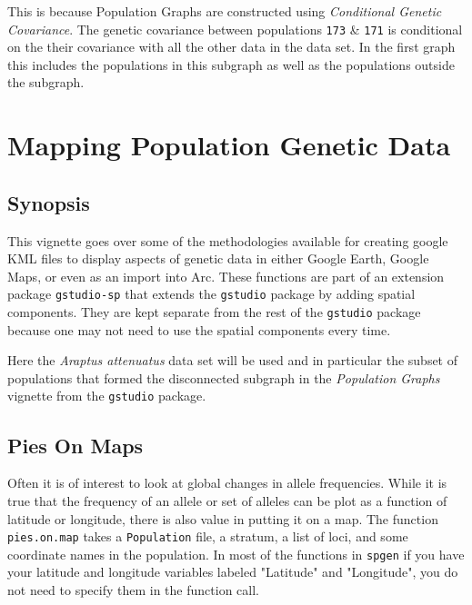 \documentclass[letterpaper,twoside,openany]{book}
\begin{document}
This is because Population Graphs are constructed using \emph{Conditional Genetic Covariance}.  The genetic covariance between populations \texttt{173} \& \texttt{171} is conditional on the their covariance with all the other data in the data set.  In the first graph this includes the populations in this subgraph as well as the populations outside the subgraph.  
%
%


\chapter{Mapping Population Genetic Data}

\section{Synopsis}

This vignette goes over some of the methodologies available for creating google KML files to display aspects of genetic data in either Google Earth, Google Maps, or even as an import into Arc.  These functions are part of an extension package \texttt{gstudio-sp} that extends the \texttt{gstudio} package by adding spatial components. They are kept separate from the rest of the \texttt{gstudio} package because one may not need to use the spatial components every time.

Here the \emph{Araptus attenuatus} data set will be used and in particular the subset of populations that formed the disconnected subgraph in the \emph{Population Graphs} vignette from the \texttt{gstudio} package.

\begin{Schunk}
\end{Schunk}


\section{Pies On Maps}

Often it is of interest to look at global changes in allele frequencies.  While it is true that the frequency of an allele or set of alleles can be plot as a function of latitude or longitude, there is also value in putting it on a map. The function \texttt{pies.on.map} takes a \texttt{Population} file, a stratum, a list of loci, and some coordinate names in the population.  In most of the functions in \texttt{spgen} if you have your latitude and longitude variables labeled "Latitude" and "Longitude", you do not need to specify them in the function call. 
\end{document}
